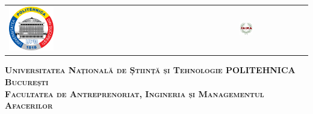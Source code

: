 



\begin{titlepage}
	\centering
	\begin{tabular}{p{6cm}p{3.3cm}}
		\includegraphics[width=0.2\textwidth]{img/upb.png} &
		\includegraphics[width=0.22\textwidth]{img/faima.png}
	\end{tabular}
	\vspace{1cm}

	{\scshape\Large \textbf{Universitatea Națională de Știință și Tehnologie POLITEHNICA București} \\}
	{\scshape\Large \textbf{Facultatea de Antreprenoriat, Ingineria și Managementul Afacerilor} \\}
	
\end{titlepage}

